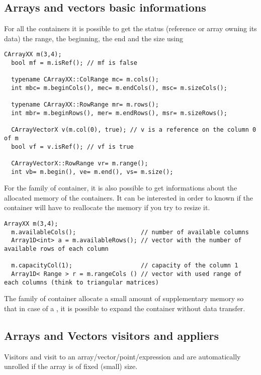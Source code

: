 \documentclass[a4paper,10pt]{article}
\begin{document}
\subsection{Arrays and vectors basic informations}

For all the containers it is possible to get the status (reference or array
owning its data) the  range, the beginning, the end and the size using
\begin{lstlisting}[style=customcpp]
  CArrayXX m(3,4);
  bool mf = m.isRef(); // mf is false

  typename CArrayXX::ColRange mc= m.cols();
  int mbc= m.beginCols(), mec= m.endCols(), msc= m.sizeCols();

  typename CArrayXX::RowRange mr= m.rows();
  int mbr= m.beginRows(), mer= m.endRows(), msr= m.sizeRows();

  CArrayVectorX v(m.col(0), true); // v is a reference on the column 0 of m
  bool vf = v.isRef(); // vf is true

  CArrayVectorX::RowRange vr= m.range();
  int vb= m.begin(), ve= m.end(), vs= m.size();
\end{lstlisting}

For the \ArrayTwoD{} family of container, it is also possible to get informations about the
allocated memory of the containers. It can be interested in order to known
if the container will have to reallocate the memory if you try to resize it.
\begin{lstlisting}[style=customcpp]
  ArrayXX m(3,4);
  m.availableCols();                  // number of available columns
  Array1D<int> a = m.availableRows(); // vector with the number of available rows of each column

  m.capacityCol(1);                   // capacity of the column 1
  Array1D< Range > r = m.rangeCols () // vector with used range of each columns (think to triangular matrices)
\end{lstlisting}
The \ArrayTwoD{} family of container allocate a small amount of supplementary memory
so that in case of a , it is possible to expand the container without
data transfer.

\subsection{Arrays and Vectors visitors and appliers}

Visitors and visit to an array/vector/point/expression
and are automatically unrolled if the array is of fixed (small) size.
\end{document}

